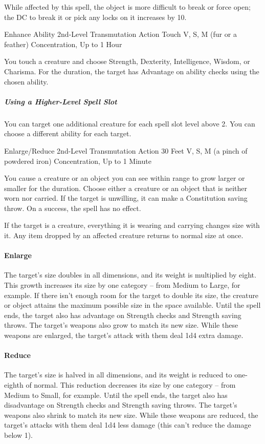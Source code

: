 \documentclass[letterpaper,openany,oneside,twocolumn]{book}
\begin{document}
While affected by this spell, the object is more difficult to break or force open; the DC to break it or pick any locks on it increases by 10.

\DndSpellHeader
  {Enhance Ability}
  {2nd-Level Transmutation}
  {Action}
  {Touch}
  {V, S, M (fur or a feather)}
  {Concentration, Up to 1 Hour}

You touch a creature and choose Strength, Dexterity, Intelligence, Wisdom, or Charisma. For the duration, the target has Advantage on ability checks using the chosen ability.

\subparagraph*{Using a Higher-Level Spell Slot} You can target one additional creature for each spell slot level above 2. You can choose a different ability for each target.

\DndSpellHeader
  {Enlarge/Reduce}
  {2nd-Level Transmutation}
  {Action}
  {30 Feet}
  {V, S, M (a pinch of powdered iron)}
  {Concentration, Up to 1 Minute}

You cause a creature or an object you can see within range to grow larger or smaller for the duration. Choose either a creature or an object that is neither worn nor carried. If the target is unwilling, it can make a Constitution saving throw. On a success, the spell has no effect.

If the target is a creature, everything it is wearing and carrying changes size with it. Any item dropped by an affected creature returns to normal size at once.

\paragraph*{Enlarge} The target's size doubles in all dimensions, and its weight is multiplied by eight. This growth increases its size by one category – from Medium to Large, for example. If there isn't enough room for the target to double its size, the creature or object attains the maximum possible size in the space available. Until the spell ends, the target also has advantage on Strength checks and Strength saving throws. The target's weapons also grow to match its new size. While these weapons are enlarged, the target's attack with them deal 1d4 extra damage.

\paragraph*{Reduce} The target's size is halved in all dimensions, and its weight is reduced to one-eighth of normal. This reduction decreases its size by one category – from Medium to Small, for example. Until the spell ends, the target also has disadvantage on Strength checks and Strength saving throws. The target's weapons also shrink to match its new size. While these weapons are reduced, the target's attacks with them deal 1d4 less damage (this can't reduce the damage below 1).
\end{document}
